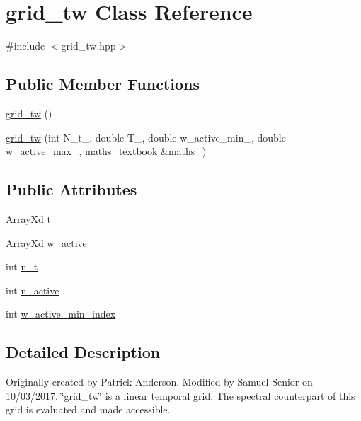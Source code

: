 \hypertarget{classgrid__tw}{}\section{grid\+\_\+tw Class Reference}
\label{classgrid__tw}


{\ttfamily \#include $<$grid\+\_\+tw.\+hpp$>$}

\subsection*{Public Member Functions}
\begin{DoxyCompactItemize}
\item 
\hyperlink{classgrid__tw_af1e2316561c84a2262e374600895010d}{grid\+\_\+tw} ()
\item 
\hyperlink{classgrid__tw_a583d4c2b423305ef3806d6221ed3f543}{grid\+\_\+tw} (int N\+\_\+t\+\_\+, double T\+\_\+, double w\+\_\+active\+\_\+min\+\_\+, double w\+\_\+active\+\_\+max\+\_\+, \hyperlink{classmaths__textbook}{maths\+\_\+textbook} \&maths\+\_\+)
\end{DoxyCompactItemize}
\subsection*{Public Attributes}
\begin{DoxyCompactItemize}
\item 
Array\+Xd \hyperlink{classgrid__tw_a918f1e6d18056d0f6da08fe01089b9b0}{t}
\item 
Array\+Xd \hyperlink{classgrid__tw_a66922766c9dfe5c4667e55e678b134b9}{w\+\_\+active}
\item 
int \hyperlink{classgrid__tw_ac121ce740479f628bdaa54627540ad42}{n\+\_\+t}
\item 
int \hyperlink{classgrid__tw_a1fbf854a0f7bd025aa98671009602c5c}{n\+\_\+active}
\item 
int \hyperlink{classgrid__tw_a27d987fb3c8cbacf9cd152b83477f0d9}{w\+\_\+active\+\_\+min\+\_\+index}
\end{DoxyCompactItemize}


\subsection{Detailed Description}
Originally created by Patrick Anderson. Modified by Samuel Senior on 10/03/2017. \char`\"{}grid\+\_\+tw\char`\"{} is a linear temporal grid. The spectral counterpart of this grid is evaluated and made accessible. 

